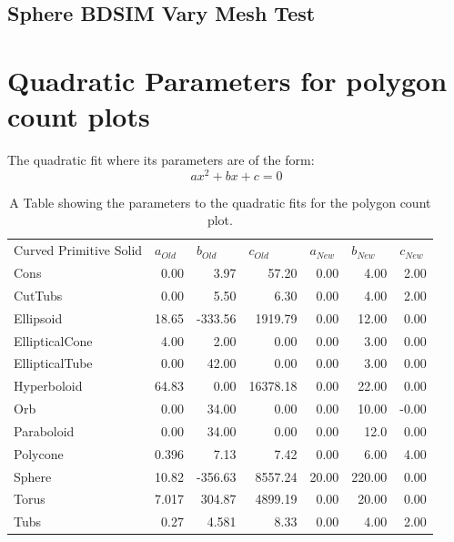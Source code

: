 \documentclass[12pt,a4paper]{article}
\begin{document}
\subsection{Sphere BDSIM Vary Mesh Test}
\label{ap1}



\small
%

\newpage
\section{Quadratic Parameters for polygon count plots}
\label{appp1}
The quadratic fit where its parameters are of the form:
\begin{equation}
ax^2 + bx + c = 0
\end{equation}
\begin{table}[h!]
  \small
  \centering
  \caption{A Table showing the parameters to the quadratic fits for the polygon count plot.}
    \begin{tabular}{lrrrrrr}
    Curved Primitive Solid & \multicolumn{1}{l}{$a_{Old}$} & \multicolumn{1}{l}{$b_{Old}$} & \multicolumn{1}{l}{$c_{Old}$} & \multicolumn{1}{l}{$a_{New}$} & \multicolumn{1}{l}{$b_{New}$} & \multicolumn{1}{l}{$c_{New}$} \\
    Cons  & 0.00  & 3.97 & 57.20 & 0.00  & 4.00 & 2.00 \\
    CutTubs & 0.00  & 5.50 & 6.30 & 0.00  & 4.00 & 2.00 \\
    Ellipsoid & 18.65 & -333.56 & 1919.79 & 0.00  & 12.00 & 0.00 \\
    EllipticalCone & 4.00 & 2.00 & 0.00  & 0.00  & 3.00 & 0.00 \\
    EllipticalTube & 0.00  & 42.00 & 0.00  & 0.00  & 3.00 & 0.00 \\
    Hyperboloid & 64.83 & 0.00  & 16378.18 & 0.00  & 22.00 & 0.00  \\
    Orb   & 0.00  & 34.00 & 0.00  & 0.00  & 10.00 & -0.00  \\
    Paraboloid & 0.00  & 34.00 & 0.00  & 0.00 & 12.0 & 0.00 \\
    Polycone & 0.396 & 7.13 & 7.42 & 0.00  & 6.00 & 4.00 \\
    Sphere & 10.82 & -356.63 & 8557.24 & 20.00 & 220.00 & 0.00  \\
    Torus & 7.017 & 304.87 & 4899.19 & 0.00  & 20.00 & 0.00  \\
    Tubs  & 0.27 & 4.581 & 8.33 & 0.00  & 4.00 & 2.00 \\
    \end{tabular}%
  \label{tab1}%
\end{table}
\end{document}
